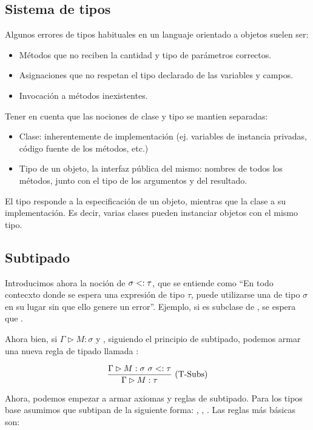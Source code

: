 \subsection{Sistema de tipos}

Algunos errores de tipos habituales en un languaje orientado a objetos suelen ser:
\begin{itemize}
  \item Métodos que no reciben la cantidad y tipo de parámetros correctos.
  \item Asignaciones que no respetan el tipo declarado de las variables y campos.
  \item Invocación a métodos inexistentes.
\end{itemize}

Tener en cuenta que las nociones de clase y tipo se mantien separadas:
\begin{itemize}
  \item Clase: inherentemente de implementación (ej. variables de instancia privadas, código fuente de los métodos, etc.)
  \item Tipo de un objeto, la interfaz pública del mismo: nombres de todos los métodos, junto con el tipo de los argumentos y del resultado.
\end{itemize}

El tipo responde a la especificación de un objeto, mientras que la clase a su implementación. Es decir, varias clases pueden instanciar objetos con el mismo tipo.

\subsection{Subtipado}

Introducimos ahora la noción de  $\sigma <: \tau$, que se entiende como ``En todo contecxto donde se espera una expresión de tipo $\tau$, puede utilizarse una de tipo $\sigma$ en su lugar sin que ello genere un error''. Ejemplo, si  es subclase de , se espera que .

Ahora bien, si $\Gamma \rhd M : \sigma$ y \subt{\sigma}{\tau}, siguiendo el principio de subtipado, podemos armar una nueva regla de tipado llamada :

\[\deriv{\Gamma \rhd M : \sigma\ \subt{\sigma}{\tau}}{\Gamma \rhd M : \tau}{T-Subs}\]

Ahora, podemos empezar a armar axiomas y reglas de subtipado. Para los tipos base asumimos que subtipan de la siguiente forma: , , . Las reglas más básicas son:

